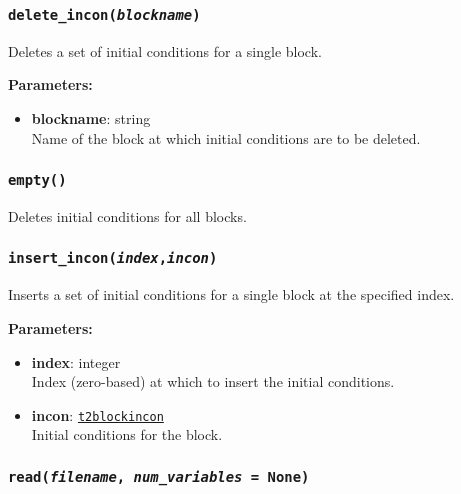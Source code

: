 \begin{snugshade}
\subsubsection{\texttt{delete\_incon(\emph{blockname})}}
\end{snugshade}
\label{sec:t2incon:delete_incon}

Deletes a set of initial conditions for a single block.

\textbf{Parameters:}
\begin{itemize}
\item \textbf{blockname}: string\\
  Name of the block at which initial conditions are to be deleted.
\end{itemize}

\begin{snugshade}
\subsubsection{\texttt{empty()}}
\end{snugshade}
\label{sec:t2incon:empty}

Deletes initial conditions for all blocks.

\begin{snugshade}
\subsubsection{\texttt{insert\_incon(\emph{index},\emph{incon})}}
\end{snugshade}
\label{sec:t2incon:insert_incon}

Inserts a set of initial conditions for a single block at the specified index.

\textbf{Parameters:}
\begin{itemize}
\item \textbf{index}: integer\\
  Index (zero-based) at which to insert the initial conditions.
\item \textbf{incon}: \hyperref[t2blockincons]{\texttt{t2blockincon}}\\
  Initial conditions for the block.
\end{itemize}

\begin{snugshade}
\subsubsection{\texttt{read(\emph{filename}, \emph{num\_variables} = None)}}
\end{snugshade}
\label{sec:t2incon:read}

